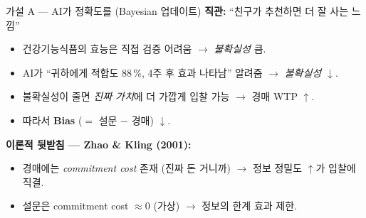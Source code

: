 \documentclass[aspectratio=169]{beamer}
\begin{document}
\begin{frame}{가설 A --- AI가 정확도를  (Bayesian 업데이트)}
  \textbf{직관:} ``친구가 추천하면 더 잘 사는 느낌''
  \begin{itemize}
    \item 건강기능식품의 효능은 직접 검증 어려움 $\rightarrow$ \emph{불확실성} 큼.
    \item AI가 ``귀하에게 적합도 88\,\%, 4주 후 효과 나타남'' 알려줌 $\rightarrow$ \emph{불확실성 $\downarrow$}.
    \item 불확실성이 줄면 \emph{진짜 가치}에 더 가깝게 입찰 가능 $\rightarrow$ 경매 WTP $\uparrow$.
    \item 따라서 \textbf{Bias} ($=$ 설문 $-$ 경매) $\downarrow$.
  \end{itemize}

  \vspace{0.4em}
  \textbf{이론적 뒷받침 --- Zhao \& Kling (2001):}
  \begin{itemize}\itemsep0.1em
    \item 경매에는 \emph{commitment cost} 존재 (진짜 돈 거니까) $\rightarrow$ 정보 정밀도 $\uparrow$가 입찰에 직결.
    \item 설문은 commitment cost $\approx 0$ (가상) $\rightarrow$ 정보의 한계 효과 제한.
  \end{itemize}

  \vspace{0.3em}
\end{frame}
\end{document}
